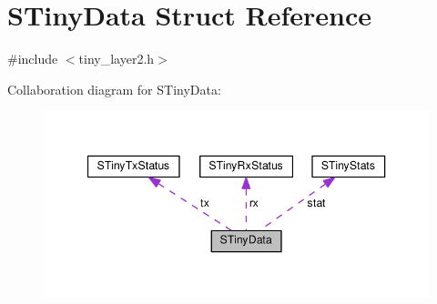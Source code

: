 \hypertarget{structSTinyData}{}\section{S\+Tiny\+Data Struct Reference}
\label{structSTinyData}


{\ttfamily \#include $<$tiny\+\_\+layer2.\+h$>$}



Collaboration diagram for S\+Tiny\+Data\+:
\nopagebreak
\begin{figure}[H]
\begin{center}
\leavevmode
\includegraphics[width=347pt]{structSTinyData__coll__graph}
\end{center}
\end{figure}
